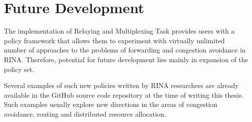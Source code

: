     \section{Future Development}

    The implementation of Relaying and Multiplexing Task provides users with a policy framework that allows them to experiment with virtually unlimited number of approaches to the problems of forwarding and congestion avoidance in RINA. Therefore, potential for future development lies mainly in expansion of the policy set.

    Several examples of such new policies written by RINA researchers are already available in the GitHub source code repository at the time of writing this thesis. Such examples usually explore new directions in the areas of congestion avoidance, routing and distributed resource allocation.


